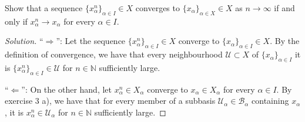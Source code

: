 \documentclass[a4paper]{article}
\begin{document}
Show that a sequence \(\{x_\alpha^n\}_{\alpha \in I} \in X\) converges to \(\{x_\alpha\}_{\alpha \in X} \in X\) as \(n \longrightarrow \infty\) if and only if \(x^n_\alpha \longrightarrow x_\alpha\) for every \(\alpha \in I\).

\begin{proof}[Solution]
    ``\(\Rightarrow\)'': Let the sequence \(\{x_\alpha^n\}_{\alpha \in I} \in X\) converge to \(\{x_\alpha\}_{\alpha \in I} \in X\). By the definition of convergence, we have that every neighbourhood \(\mathcal{U} \subset X\) of \(\{x_\alpha\}_{\alpha \in I}\) it is \(\{x_\alpha^n\}_{\alpha \in I} \in \mathcal{U}\) for \(n \in \mathbb{N}\) sufficiently large.

    ``\(\Leftarrow\)'': On the other hand, let \(x^n_\alpha \in X_\alpha\) converge to \(x_\alpha \in X_\alpha\) for every \(\alpha \in I\). By exercise 3 a), we have that for every member of a subbasis \(\mathcal{U}_\alpha \in \mathcal{B}_\alpha\) containing \(x_\alpha\), it is \(x_\alpha^n \in \mathcal{U}_\alpha\) for \(n \in \mathbb{N}\) sufficiently large.
\end{proof}
\end{document}
